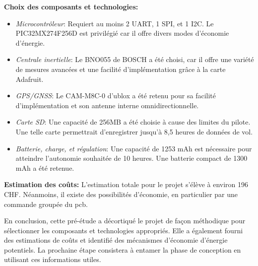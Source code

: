 \textbf{Choix des composants et technologies:}
\begin{itemize}
	\item \textit{Microcontrôleur}: Requiert au moins 2 UART, 1 SPI, et 1 I2C. Le PIC32MX274F256D est privilégié car il offre divers modes d'économie d'énergie.
	\item \textit{Centrale inertielle}: Le BNO055 de BOSCH a été choisi, car il offre une variété de mesures avancées et une facilité d'implémentation grâce à la carte Adafruit.
	\item \textit{GPS/GNSS}: Le CAM-M8C-0 d'ublox a été retenu pour sa facilité d'implémentation et son antenne interne omnidirectionnelle.
	\item \textit{Carte SD}: Une capacité de 256MB a été choisie à cause des limites du pilote. Une telle carte permettrait d'enregistrer jusqu'à 8,5 heures de données de vol.
	\item \textit{Batterie, charge, et régulation}: Une capacité de 1253 mAh est nécessaire pour atteindre l'autonomie souhaitée de 10 heures. Une batterie compact de 1300 mAh a été retenue.
\end{itemize}

\textbf{Estimation des coûts:}
L'estimation totale pour le projet s'élève à environ 196 CHF. Néanmoins, il existe des possibilités d'économie, en particulier par une commande groupée du \gls{pcb}.

En conclusion, cette pré-étude a décortiqué le projet de façon méthodique pour sélectionner les composants et technologies appropriés. Elle a également fourni des estimations de coûts et identifié des mécanismes d'économie d'énergie potentiels. La prochaine étape consistera à entamer la phase de conception en utilisant ces informations utiles.
